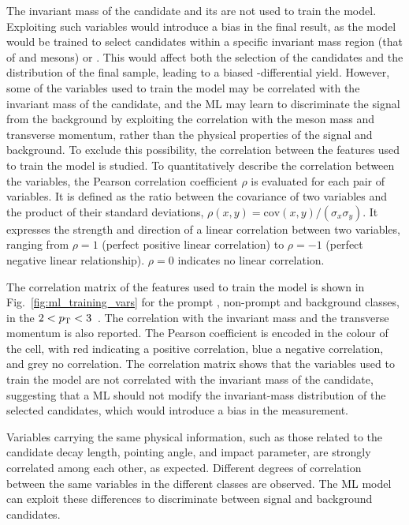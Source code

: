 The invariant mass of the candidate and its \pt are not used to train the model. Exploiting such variables would introduce a bias in the final result, as the model would be trained to select candidates within a specific invariant mass region (that of \ds and \dpl mesons) or \pt. This would affect both the selection of the candidates and the \pt distribution of the final sample, leading to a biased \pt-differential yield. However, some of the variables used to train the model may be correlated with the invariant mass of the candidate, and the ML may learn to discriminate the signal from the background by exploiting the correlation with the \ds meson mass and transverse momentum, rather than the physical properties of the signal and background. To exclude this possibility, the correlation between the features used to train the model is studied. To quantitatively describe the correlation between the variables, the Pearson correlation coefficient $\rho$ is evaluated for each pair of variables. It is defined as the ratio between the covariance of two variables and the product of their standard deviations, $\rho(x,y) = \mathrm{cov}(x,y)/(\sigma_{x}\sigma_{y})$. It expresses the strength and direction of a linear correlation between two variables, ranging from $\rho = 1$ (perfect positive linear correlation) to $\rho = -1$ (perfect negative linear relationship). $\rho = 0$ indicates no linear correlation.

The correlation matrix of the features used to train the model is shown in Fig.~\ref{fig:ml_training_vars} for the prompt \ds, non-prompt \ds and background classes, in the $2<p_\mathrm{T}<3$~\gevc. The correlation with the invariant mass and the transverse momentum is also reported. The Pearson coefficient is encoded in the colour of the cell, with red indicating a positive correlation, blue a negative correlation, and grey no correlation. The correlation matrix shows that the variables used to train the model are not correlated with the invariant mass of the candidate, suggesting that a ML should not modify the invariant-mass distribution of the selected candidates, which would introduce a bias in the measurement.

Variables carrying the same physical information, such as those related to the candidate decay length, pointing angle, and impact parameter, are strongly correlated among each other, as expected. Different degrees of correlation between the same variables in the different classes are observed. The ML model can exploit these differences to discriminate between signal and background candidates.

